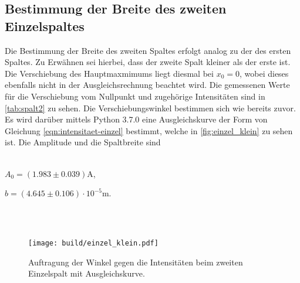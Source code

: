 %
%
\subsection{Bestimmung der Breite des zweiten Einzelspaltes}
    Die Bestimmung der Breite des zweiten Spaltes erfolgt analog zu der des ersten Spaltes. Zu Erwähnen sei hierbei, dass der zweite Spalt kleiner 
    als der erste ist. Die Verschiebung des Hauptmaxmimums liegt diesmal bei $x_0 = 0$, wobei dieses ebenfalls nicht in der Ausgleichsrechnung
    beachtet wird. Die gemessenen Werte für die Verschiebung vom Nullpunkt und zugehörige Intensitäten sind 
    in \autoref{tab:spalt2} zu sehen. Die Verschiebungswinkel bestimmen sich wie bereits zuvor.
    Es wird darüber mittels Python 3.7.0 eine Ausgleichskurve der Form von Gleichung 
    \eqref{eqn:intensitaet-einzel} bestimmt, welche in \autoref{fig:einzel_klein} zu sehen ist. Die Amplitude und die Spaltbreite sind 
    \\ \\ 
    \centerline{$A_0 = (1.983 \pm 0.039) $A,}
    \centerline{$b = (4.645\pm 0.106) \cdot 10^{-5}$m.}
    \\ \\
    
    \begin{figure}
        \centering
        \texttt{[image: build/einzel\_klein.pdf]}
        \caption{Auftragung der Winkel gegen die Intensitäten beim zweiten Einzelspalt mit Ausgleichskurve.}
        \label{fig:einzel_klein}
    \end{figure}

